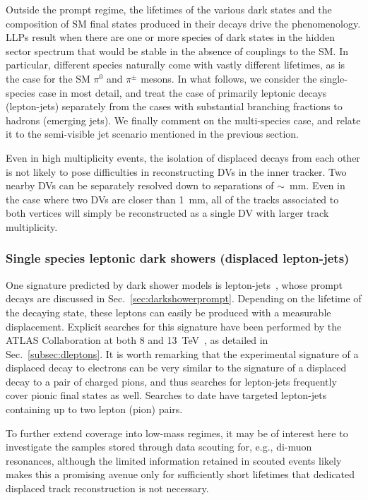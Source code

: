 Outside the prompt regime, the lifetimes of the various dark states and the composition of SM final states produced in their decays drive the phenomenology. LLPs result when there are one or more species of dark states in the hidden sector spectrum that would be stable in the absence of couplings to the SM. In particular, different species naturally come with vastly different lifetimes, as is the case for the SM $\pi^0$ and $\pi^\pm$ mesons. In what follows, we consider the single-species case in most detail, and treat the case of primarily leptonic decays (lepton-jets)  separately from the cases with substantial branching fractions to hadrons (emerging jets). We finally comment on the multi-species case, and relate it to the semi-visible jet scenario mentioned in the previous section.

Even in high multiplicity events, the isolation of displaced decays from each other is not likely to pose difficulties in reconstructing DVs in the inner tracker.  Two nearby DVs can be separately resolved down to separations of $\sim$~mm.  Even in the case where two DVs are closer than 1~mm, all of the tracks associated to both vertices will simply be reconstructed as a single DV with larger track multiplicity.

\subsubsection{Single species leptonic dark showers (displaced lepton-jets)}
\label{sec:leptonjetsoffline}
One signature predicted by dark shower models is lepton-jets~\cite{Falkowski:2010cm,Falkowski:2010gv}, whose prompt decays are discussed in Sec.~\ref{sec:darkshowerprompt}. Depending on the lifetime of the decaying state, these leptons can easily be produced with a measurable displacement. Explicit searches for this signature have been performed by the ATLAS Collaboration at both 8 and 13~TeV~\cite{Aad:2014yea, ATLAS-CONF-2016-042}, as detailed in Sec.~\ref{subsec:dleptons}. It is worth remarking that the experimental signature of a displaced decay to electrons can be very similar to the signature of a displaced decay to a pair of charged pions, and thus searches for lepton-jets frequently cover pionic final states as well. Searches to date have targeted lepton-jets containing up to two lepton (pion) pairs.

To further extend coverage into low-mass regimes, it may be of interest here to investigate the samples stored through data scouting for, e.g., di-muon resonances, although the limited information retained in scouted events likely makes this a promising avenue only for sufficiently short lifetimes that dedicated displaced track reconstruction is not necessary.

